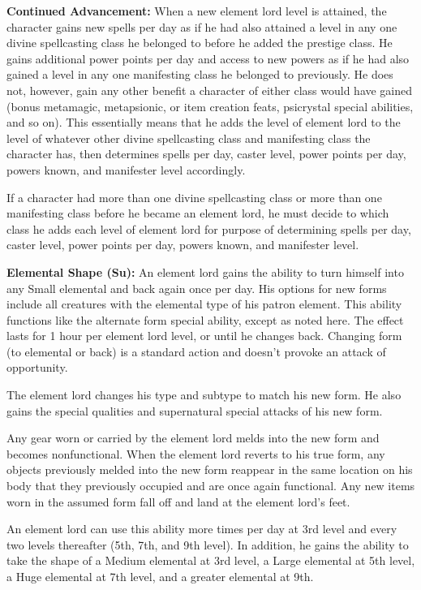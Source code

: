 {
\textbf{Continued Advancement:} When a new element lord level is attained, the character gains new spells per day as if he had also attained a level in any one divine spellcasting class he belonged to before he added the prestige class. He gains additional power points per day and access to new powers as if he had also gained a level in any one manifesting class he belonged to previously. He does not, however, gain any other benefit a character of either class would have gained (bonus metamagic, metapsionic, or item creation feats, psicrystal special abilities, and so on). This essentially means that he adds the level of element lord to the level of whatever other divine spellcasting class and manifesting class the character has, then determines spells per day, caster level, power points per day, powers known, and manifester level accordingly.

If a character had more than one divine spellcasting class or more than one manifesting class before he became an element lord, he must decide to which class he adds each level of element lord for purpose of determining spells per day, caster level, power points per day, powers known, and manifester level.

\textbf{Elemental Shape (Su):} An element lord gains the ability to turn himself into any Small elemental and back again once per day. His options for new forms include all creatures with the elemental type of his patron element. This ability functions like the alternate form special ability, except as noted here. The effect lasts for 1 hour per element lord level, or until he changes back. Changing form (to elemental or back) is a standard action and doesn't provoke an attack of opportunity.

The element lord changes his type and subtype to match his new form. He also gains the special qualities and supernatural special attacks of his new form.

Any gear worn or carried by the element lord melds into the new form and becomes nonfunctional. When the element lord reverts to his true form, any objects previously melded into the new form reappear in the same location on his body that they previously occupied and are once again functional. Any new items worn in the assumed form fall off and land at the element lord's feet.

An element lord can use this ability more times per day at 3rd level and every two levels thereafter (5th, 7th, and 9th level). In addition, he gains the ability to take the shape of a Medium elemental at 3rd level, a Large elemental at 5th level, a Huge elemental at 7th level, and a greater elemental at 9th.

}
